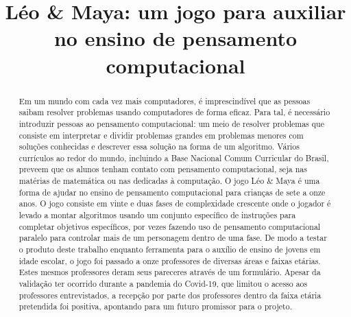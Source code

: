 \documentclass[conference]{IEEEtran}
\begin{document}
\title{Léo \& Maya: um jogo para auxiliar no ensino de pensamento computacional
}

\author{
\and
{}
}

\maketitle

\begin{abstract}
Em um mundo com cada vez mais computadores, é imprescindível que as pessoas saibam resolver problemas usando computadores de forma eficaz. Para tal, é necessário introduzir pessoas ao pensamento computacional: um meio de resolver problemas que consiste em interpretar e dividir problemas grandes em problemas menores com soluções conhecidas e descrever essa solução na forma de um algoritmo. Vários currículos ao redor do mundo, incluindo a Base Nacional Comum Curricular do Brasil, preveem que os alunos tenham contato com pensamento computacional, seja nas matérias de matemática ou nas dedicadas à computação. O jogo Léo \& Maya é uma forma de ajudar no ensino de pensamento computacional para crianças de sete a onze anos. O jogo consiste em vinte e duas fases de complexidade crescente onde o jogador é levado a montar algoritmos usando um conjunto específico de instruções para completar objetivos específicos, por vezes fazendo uso de pensamento computacional paralelo para controlar mais de um personagem dentro de uma fase. De modo a testar o produto deste trabalho enquanto ferramenta para o auxílio de ensino de jovens em idade escolar, o jogo foi passado a onze professores de diversas áreas e faixas etárias. Estes mesmos professores deram seus pareceres através de um formulário. Apesar da validação ter ocorrido durante a pandemia do Covid-19, que limitou o acesso aos professores entrevistados, a recepção por parte dos professores dentro da faixa etária pretendida foi positiva, apontando para um futuro promissor para o projeto.
\end{abstract}
\end{document}
